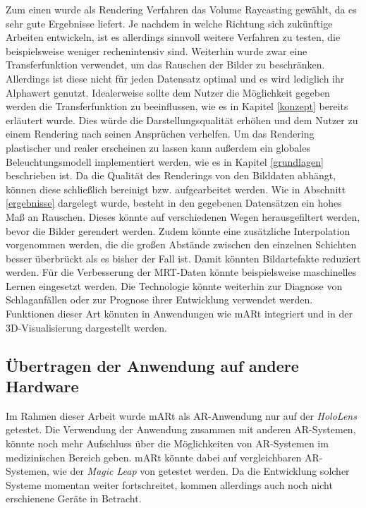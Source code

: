 Zum einen wurde als Rendering Verfahren das Volume Raycasting gewählt, da es sehr gute Ergebnisse liefert. Je nachdem in welche Richtung sich zukünftige Arbeiten entwickeln, ist es allerdings sinnvoll weitere Verfahren zu testen, die beispielsweise weniger rechenintensiv sind. 
Weiterhin wurde zwar eine Transferfunktion verwendet, um das Rauschen der Bilder zu beschränken. Allerdings ist diese nicht für jeden Datensatz optimal und es wird lediglich ihr Alphawert genutzt. 
Idealerweise sollte dem Nutzer die Möglichkeit gegeben werden die Transferfunktion zu beeinflussen, wie es in Kapitel \ref{konzept} bereits erläutert wurde. Dies würde die Darstellungsqualität erhöhen und dem Nutzer zu einem Rendering nach seinen Ansprüchen verhelfen. 
Um das Rendering plastischer und realer erscheinen zu lassen kann außerdem ein globales Beleuchtungsmodell implementiert werden, wie es in Kapitel \ref{grundlagen} beschrieben ist. 
Da die Qualität des Renderings von den Bilddaten abhängt, können diese schließlich bereinigt bzw. aufgearbeitet werden. Wie in Abschnitt \ref{ergebnisse} dargelegt wurde, besteht in den gegebenen Datensätzen ein hohes Maß an Rauschen. Dieses könnte auf verschiedenen Wegen herausgefiltert werden, bevor die Bilder gerendert werden. Zudem könnte eine zusätzliche Interpolation vorgenommen werden, die die großen Abstände zwischen den einzelnen Schichten besser überbrückt als es bisher der Fall ist. Damit könnten Bildartefakte reduziert werden. 
Für die Verbesserung der MRT-Daten könnte beispielsweise maschinelles Lernen eingesetzt werden.
Die Technologie könnte weiterhin zur Diagnose von Schlaganfällen oder zur Prognose ihrer Entwicklung verwendet werden. Funktionen dieser Art könnten in Anwendungen wie mARt  integriert und in der 3D-Visualisierung dargestellt werden.

\subsection{Übertragen der Anwendung auf andere Hardware}
\label{hololens2Fazit}

Im Rahmen dieser Arbeit wurde mARt als AR-Anwendung nur auf der \textit{HoloLens} getestet. 
Die Verwendung der Anwendung zusammen mit anderen AR-Systemen, könnte noch mehr Aufschluss über die Möglichkeiten von AR-Systemen im medizinischen Bereich geben. 
mARt könnte dabei auf vergleichbaren AR-Systemen, wie der \textit{Magic Leap} von \cite{magicLeap} getestet werden.
Da die Entwicklung solcher Systeme momentan weiter fortschreitet, kommen allerdings auch noch nicht erschienene Geräte in Betracht.

